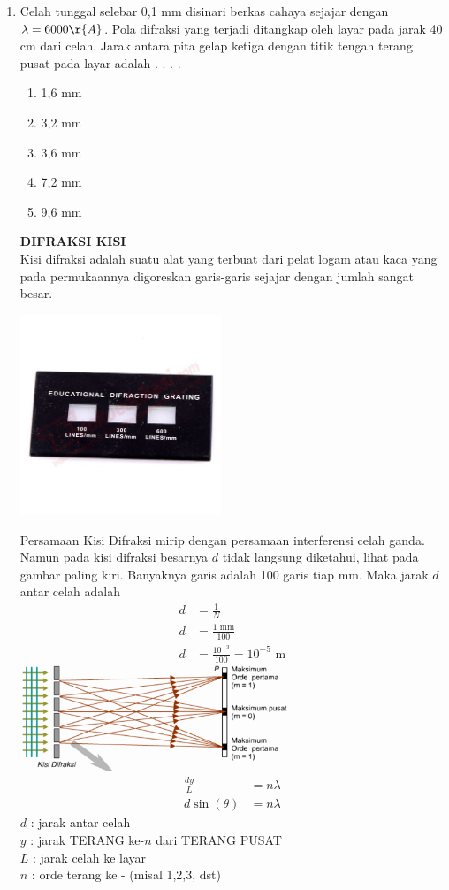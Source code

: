 \documentclass[10pt,a4paper]{extarticle}
\newcommand{\pilgani}[1]{                            \vspace{-0.3cm}\begin{multicols}{2}
 \begin{enumerate}[label=\Alph*., itemsep=0pt,topsep=0pt,leftmargin=*,align=Center]#1                     \end{enumerate}
 \phantom{ini cuma sapi, wedus, dan ayam}
 \end{multicols}}
\begin{document}
\begin{multicols*}{2}
\begin{enumerate}
\item Celah tunggal selebar 0,1 mm disinari berkas cahaya sejajar dengan $\lambda = 6000 \r{A}$. Pola difraksi yang terjadi ditangkap oleh layar pada jarak 40 cm dari celah. Jarak antara pita gelap ketiga dengan titik tengah terang pusat pada layar adalah . . . .
\pilgani{
        \item 1,6 mm
        \item 3,2 mm
        \item 3,6 mm
        \item 7,2 mm
        \item 9,6 mm
        }

\vspace{5cm}

\textbf{DIFRAKSI KISI}\\
Kisi difraksi adalah suatu alat yang terbuat dari pelat logam atau kaca yang pada permukaannya digoreskan garis-garis sejajar dengan jumlah sangat besar.

\includegraphics[width=6cm]{pic/kisi2}

Persamaan Kisi Difraksi mirip dengan persamaan interferensi celah ganda. Namun pada kisi difraksi besarnya $d$ tidak langsung diketahui, lihat pada gambar paling kiri. Banyaknya garis adalah 100 garis tiap mm. Maka jarak $d$ antar celah adalah
\begin{align*}
d &= \frac{1}{N}\\
d &=\frac{1 \text{ mm}}{100}\\
d &=\frac{ 10^{-3}}{100}=10^{-5}\text{ m}
\end{align*}
\includegraphics[width=8cm]{pic/kisi}\\
\begin{align*}
\frac{dy}{L} &= n \lambda\\
d \sin (\theta) &= n \lambda
\end{align*}
$d$ : jarak antar celah\\
$y$ : jarak TERANG ke-$n$ dari TERANG PUSAT\\
$L$ : jarak celah ke layar\\ 
$n$ : orde terang ke - (misal 1,2,3, dst)\\



\end{enumerate}
\end{multicols*}
\end{document}
